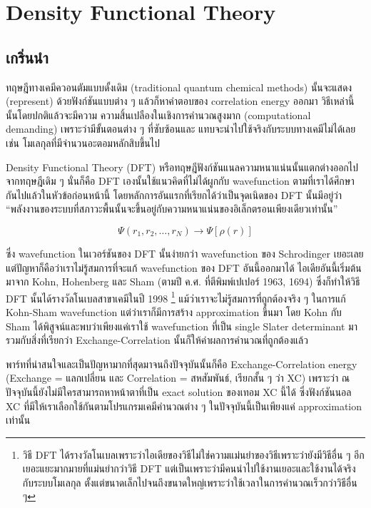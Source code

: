 
\chapter{Density Functional Theory}

\section{เกริ่นนำ}

ทฤษฎีทางเคมีควอนตัมแบบดั้งเดิม (traditional quantum chemical methods) นั้นจะแสดง (represent) 
ด้วยฟังก์ชันแบบต่าง ๆ แล้วก็หาคำตอบของ correlation energy ออกมา วิธีเหล่านี้นั้นโดยปกติแล้วจะมีความ%
ความสิ้นเปลืองในเชิงการคำนวณสูงมาก (computational demanding) เพราะว่ามีขั้นตอนต่าง ๆ ที่ซับซ้อนและ%
แทบจะนำไปใช้จริงกับระบบทางเคมีไม่ได้เลย เช่น โมเลกุลที่มีจำนวนอะตอมหลักสิบขึ้นไป

Density Functional Theory (DFT) หรือทฤษฎีฟังก์ชันแนลความหนาแน่นนั้นแตกต่างออกไปจากทฤษฎีเดิม ๆ 
นั่นก็คือ DFT เองนั้นใช้แนวคิดที่ไม่ได้ผูกกับ wavefunction ตามที่เราได้ศึกษากันไปแล้วในหัวข้อก่อนหน้านี้ 
โดยหลักการอันแรกที่เรียกได้ว่าเป็นจุดเนิดของ DFT นั้นมีอยู่ว่า 
\enquote{พลังงานของระบบที่สภาวะพื้นนั้นจะขึ้นอยู่กับความหนาแน่นของอิเล็กตรอนเพียงเดียวเท่านั้น}

\begin{equation}
    \Psi(r_{1}, r_{2}, \dots, r_{N}) \rightarrow \Psi[\rho(r)]
\end{equation}

\noindent ซึ่ง wavefunction ในเวอร์ชันของ DFT นั้นง่ายกว่า wavefunction ของ Schrodinger เยอะเลย
แต่ปัญหาก็คือว่าเราไม่รู้สมการที่จะแก้ wavefunction ของ DFT อันนี้ออกมาได้ ไอเดียอันนี้เริ่มต้นมาจาก
Kohn, Hohenberg และ Sham (ตามปี ค.ศ. ที่ตีพิมพ์เปเปอร์ 1963, 1694) ซึ่งก็ทำให้วิธี
DFT นั้นได้รางวัลโนเบลสาขาเคมีในปี 1998%
\footnote{วิธี DFT ได้รางวัลโนเบลเพราะว่าไอเดียของวิธีไม่ใช่ความแม่นยำของวิธีเพราะว่ายังมีวิธีอื่น ๆ 
อีกเยอะแยะมากมายที่แม่นยำกว่าวิธี DFT แต่เป็นเพราะว่ามีคนนำไปใช้งานเยอะและใช้งานได้จริงกับระบบโมเลกุล%
ตั้งแต่ขนาดเล็กไปจนถึงขนาดใหญ่เพราะว่าใช้เวลาในการคำนวณเร็วกว่าวิธีอื่น ๆ} 
แม้ว่าเราจะไม่รู้สมการที่ถูกต้องจริง ๆ ในการแก้ Kohn-Sham wavefunction แต่ว่าเราก็มีการสร้าง 
approximation ขึ้นมา โดย Kohn กับ Sham ได้พิสูจน์และพบว่าเพียงแค่เราใช้ wavefunction ที่เป็น 
single Slater determinant มารวมกับสิ่งที่เรียกว่า Exchange-Correlation นั้นก็ให้ค่าผลการคำนวณที่ถูกต้องแล้ว

พาร์ทที่น่าสนใจและเป็นปัญหามากที่สุดมาจนถึงปัจจุบันนั้นก็คือ Exchange-Correlation energy 
(Exchange = แลกเปลี่ยน และ Correlation = สหสัมพันธ์, เรียกสั้น ๆ ว่า XC)  เพราะว่า 
ณ ปัจจุบันนี้ยังไม่มีใครสามารถหาหน้าตาที่เป็น exact solution ของเทอม XC นี้ได้ ซึ่งฟังก์ชันนอล XC 
ที่มีให้เราเลือกใช้กันตามโปรแกรมเคมีคำนวณต่าง ๆ ในปัจจุบันนี้เป็นเพียงแค่ approximation เท่านั้น

